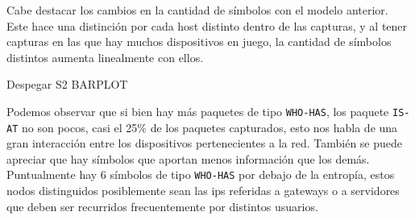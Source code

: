 Cabe destacar los cambios en la cantidad de símbolos con el modelo anterior. Este hace una distinción por cada host distinto dentro de las capturas, y al tener capturas en las que hay muchos dispositivos en juego, la cantidad de símbolos distintos aumenta linealmente con ellos.

Despegar S2 BARPLOT

Podemos observar que si bien hay más paquetes de tipo \texttt{WHO-HAS}, los paquete \texttt{IS-AT} no son pocos, casi el 25\% de los paquetes capturados, esto nos habla de una gran interacción entre los dispositivos pertenecientes a la red. También se puede apreciar que hay símbolos que aportan menos información que los demás. Puntualmente hay 6 símbolos de tipo \texttt{WHO-HAS} por debajo de la entropía, estos nodos distinguidos posiblemente sean las ips referidas a gateways o a servidores que deben ser recurridos frecuentemente por distintos usuarios.


